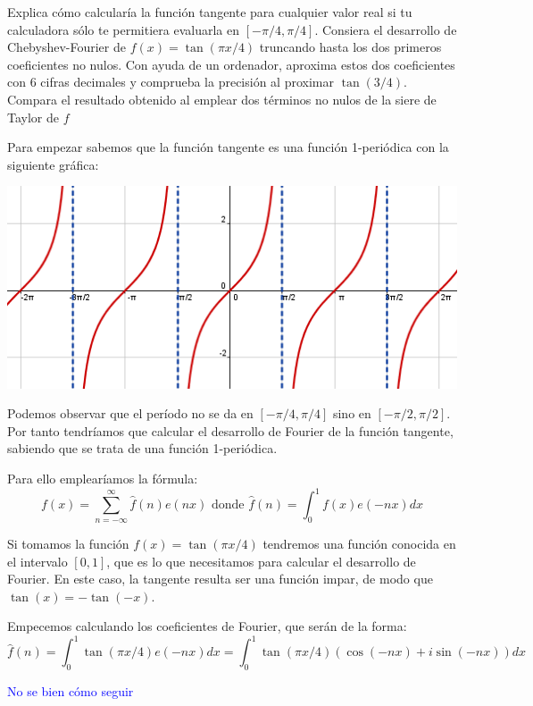 \begin{problem}[11]
Explica cómo calcularía la función tangente para cualquier valor real si tu calculadora sólo te permitiera evaluarla en $[-π/4,π/4]$. Consiera el desarrollo de Chebyshev-Fourier de $f(x)=\tan(πx/4)$ truncando hasta los dos primeros coeficientes no nulos. Con ayuda de un ordenador, aproxima estos dos coeficientes con 6 cifras decimales y comprueba la precisión al proximar $\tan (3/4)$. Compara el resultado obtenido al emplear dos términos no nulos de la siere de Taylor de $f$
\solution

Para empezar sabemos que la función tangente es una función 1-periódica con la siguiente gráfica:

\begin{center}
	\includegraphics{img/grafica_tangente.png}
\end{center}

Podemos observar que el período no se da en $[-π/4,π/4]$ sino en $[-π/2,π/2]$. Por tanto tendríamos que calcular el desarrollo de Fourier de la función tangente, sabiendo que se trata de una función 1-periódica.

Para ello emplearíamos la fórmula:
\[f(x)=\sum_{n=-\infty}^{\infty}\hat{f}(n)e(nx)\text{ donde } \hat{f}(n)=\int_0^1 f(x)e(-nx)dx\]

Si tomamos la función $f(x)=\tan(πx/4)$ tendremos una función conocida en el intervalo $[0,1]$, que es lo que necesitamos para calcular el desarrollo de Fourier. En este caso, la tangente resulta ser una función impar, de modo que $\tan (x) = -\tan(-x)$.

Empecemos calculando los coeficientes de Fourier, que serán de la forma:
\[\hat{f}(n)=\int_0^1 \tan(πx/4)e(-nx)dx=\int_0^1 \tan(πx/4)(\cos(-nx)+i\sin(-nx))dx\]


\textcolor{blue}{No se bien cómo seguir}

\end{problem}

